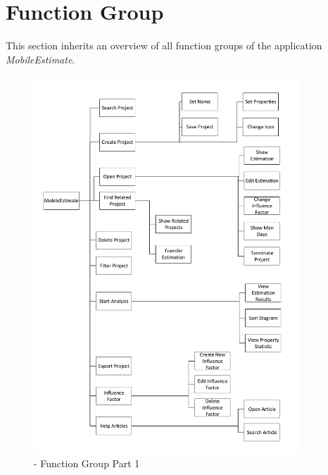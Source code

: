 \chapter{Function Group}
\label{app:funcgroup}

This section inherits an overview of all function groups of the application \textit{MobileEstimate}.
\begin{figure}[h] 
	\centering 
	\includegraphics[width=10cm]{images/ScreenOverview.pdf} 
	\caption{- Function Group Part 1} 
	\label{completefunctiongroup}
\end{figure}

